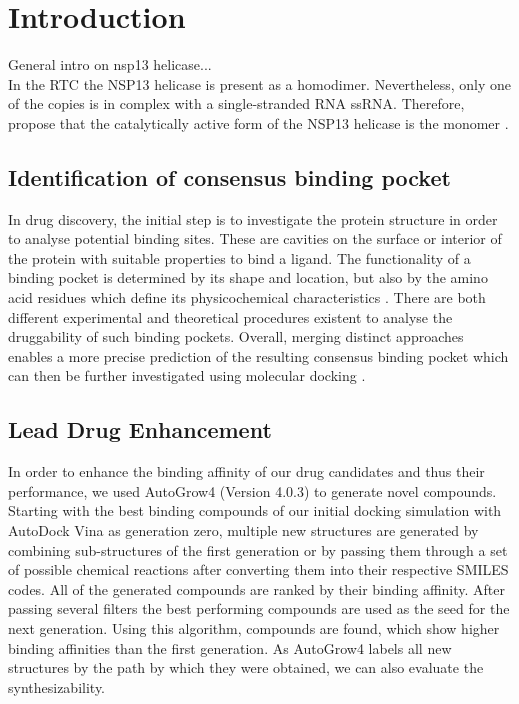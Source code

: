 \documentclass[11pt, letterpaper, titlepage]{article}
\renewcommand{\cite}{\parencite}
\begin{document}
\newpage

\section{Introduction}
General intro on nsp13 helicase... \\
In the \ac{RTC} the NSP13 helicase is present as a homodimer. Nevertheless, only one of the copies is in complex with a single-stranded RNA \ac{ssRNA}. Therefore, \textcite{Berta_2021} propose that the catalytically active form of the NSP13 helicase is the monomer \cite{Berta_2021}.  


\subsection{Identification of consensus binding pocket}
In drug discovery, the initial step is to investigate the protein structure in order to analyse potential binding sites. These are cavities on the surface or interior of the protein with suitable properties to bind a ligand. The functionality of a binding pocket is determined by its shape and location, but also by the amino acid residues which define its physicochemical characteristics \cite{Stank_2016}. 
There are both different experimental and theoretical procedures existent to analyse the druggability of such binding pockets. Overall, merging distinct approaches enables a more precise prediction of the resulting consensus binding pocket which can then be further investigated using molecular docking \cite{Ricci_2022}. 

\subsection{Lead Drug Enhancement}
In order to enhance the binding affinity of our drug candidates and thus their performance, we used AutoGrow4 (Version 4.0.3) \cite{package_Autogrow4} to generate novel compounds. Starting with the best binding compounds of our initial docking simulation with AutoDock Vina as generation zero, multiple new structures are generated by combining sub-structures of the first generation or by passing them through a set of possible chemical reactions after converting them into their respective SMILES codes. All of the generated compounds are ranked by their binding affinity. After passing several filters the best performing compounds are used as the seed for the next generation. Using this algorithm, compounds are found, which show higher binding affinities than the first generation. As AutoGrow4 labels all new structures by the path by which they were obtained, we can also evaluate the synthesizability.  
\end{document}
